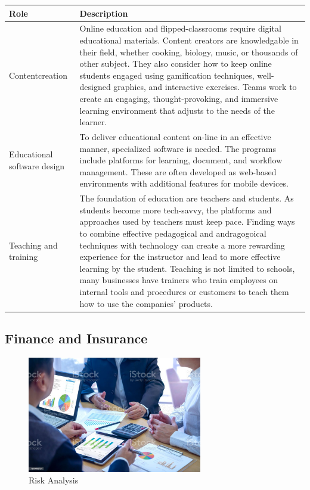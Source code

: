 \begin{table}[H]
	\begin{center}
		\begin{tabular}{p{1in}|p{3.4in}} 
			\textbf{Role} & \textbf{Description}\\
			\hline
			Content\linebreak creation & Online education and flipped-classrooms require digital educational materials. Content creators are knowledgable in their field, whether cooking, biology, music, or thousands of other subject. They also consider how to keep online students engaged using gamification techniques, well-designed graphics, and interactive exercises. Teams work to create an engaging, thought-provoking, and immersive learning environment that adjusts to the needs of the learner.\\
			\hline
			Educational software design & To deliver educational content on-line in an effective manner, specialized software is needed. The programs include platforms for learning, document, and workflow management. These are often developed as web-based environments with additional features for mobile devices.\\
			\hline
			Teaching and training & The foundation of education are teachers and students. As students become more tech-savvy, the platforms and approaches used by teachers must keep pace. Finding ways to combine effective pedagogical and andragogoical techniques with technology can create a more rewarding experience for the instructor and lead to more effective learning by the student. Teaching is not limited to schools, many businesses have trainers who train employees on internal tools and procedures or customers to teach them how to use the companies' products.\\
			\hline
		\end{tabular}
	\end{center}
\end{table}

\subsection{Finance and Insurance}

\begin{figure}[H]
	\begin{center}
		\caption{Risk Analysis}
		\vskip 4pt
		\includegraphics[height=2in]{images/careers/istockphoto-1210565724-1024x1024.jpg}
	\end{center}
\end{figure}

